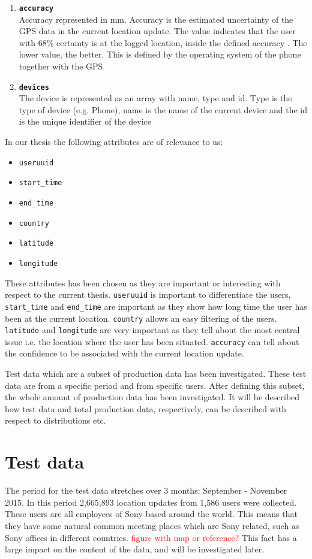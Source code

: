 \begin{enumerate}
\item \texttt{\textbf{accuracy}}\\Accuracy represented in mm. Accuracy is the estimated uncertainty of the GPS data in the current location update. The value indicates that the user with 68\% certainty is at the logged location, inside the defined accuracy \cite{android_accuracy}. The lower value, the better. This is defined by the operating system of the phone together with the GPS 
\item \texttt{\textbf{devices}}\\The device is represented as an array with name, type and id. Type is the type of device (e.g. Phone), name is the name of the current device and the id is the unique identifier of the device 
\end{enumerate}

In our thesis the following attributes are of relevance to us: 

\begin{itemize}
\item \texttt{useruuid}
\item \texttt{start\_time}
\item \texttt{end\_time}
\item \texttt{country}
\item \texttt{latitude}
\item \texttt{longitude}
\end{itemize}

These attributes has been chosen as they are important or interesting with respect to the current thesis. \texttt{useruuid} is important to differentiate the users, \texttt{start\_time} and \texttt{end\_time} are important as they show how long time the user has been at the current location. \texttt{country} allows an easy filtering of the users. \texttt{latitude} and \texttt{longitude} are very important as they tell about the most central issue i.e. the location where the user has been situated. \texttt{accuracy} can tell about the confidence to be associated with the current location update.  

Test data which are a subset of production data has been investigated. These test data are from a specific period and from specific users. After defining this subset, the whole amount of production data has been investigated.  It will be described how test data and total production data, respectively, can be described with respect to distributions etc.  

\section{Test data}
The period for the test data stretches over 3 months: September - November 2015.   
In this period 2,665,893 location updates from 1,586 users were collected. These users are all employees of Sony based around the world. This means that they have some natural common meeting places which are Sony related, such as Sony offices in different countries. \textcolor{red}{figure with map or reference?}
This fact has a large impact on the content of the data, and will be investigated later. 


